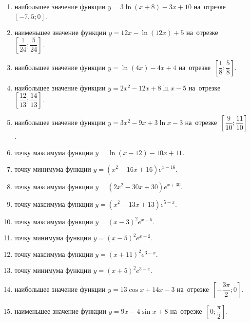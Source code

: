 \documentclass[a4paper,10pt]{article}
\begin{document}
\begin{enumerate}
\item {} наибольшее значение функции $y=3\ln \left(x+8\right)-3x+10$ на~отрезке~$\left[-7,5;0\right]$.

\item {} наименьшее значение функции $y=12x-\ln \left(12x\right)+5$ на~отрезке~$\left[\dfrac{1}{24};\dfrac{5}{24}\right]$.

\item {} наибольшее значение функции $y=\ln \left(4x\right)-4x+4$ на~отрезке~$\left[\dfrac{1}{8};\dfrac{5}{8}\right]$.

\item {} наибольшее значение функции $y=2x^2-12x+8\ln x-5$ на~отрезке~$\left[\dfrac{12}{13};\dfrac{14}{13}\right]$.

\item {} наибольшее значение функции $y=3x^2-9x+3\ln x-3$ на~отрезке~$\left[\dfrac{9}{10};\dfrac{11}{10}\right]$.

\item {} точку максимума функции $y=\ln \left(x-12\right)-10x+11$.

\item {} точку минимума функции $y=\left(x^2-16x+16\right)e^{x-16}$.

\item {} точку максимума функции $y=\left(2x^2-30x+30\right)e^{x+30}$.

\item {} точку максимума функции $y=\left(x^2-13x+13\right)e^{5-x}$.

\item {} точку максимума функции $y=\left(x-3\right)^2e^{x-5}$.

\item {} точку минимума функции $y=\left(x-5\right)^2e^{x-2}$.

\item {} точку максимума функции $y=\left(x+11\right)^2e^{3-x}$.

\item {} точку минимума функции $y=\left(x+5\right)^2e^{3-x}$.

\item {} наибольшее значение функции $y=13\cos x+14x-3$ на~отрезке~$\left[-\dfrac{3\pi }{2};0\right]$.

\item {} наименьшее значение функции $y=9x-4\sin x+8$ на~отрезке~$\left[0;\dfrac{\pi }{2}\right]$.


\end{enumerate}
\end{document}
